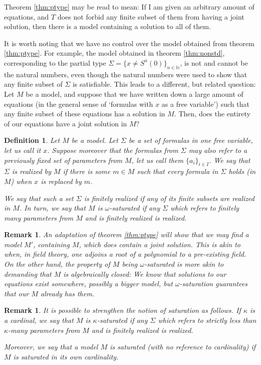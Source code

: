 \documentclass{article}
\newtheorem{remark}[theorem]{Remark}
\newtheorem{definition}[theorem]{Definition}
\theoremstyle{nonumberplain}
\newcommand{\N}{\mathbb{N}}
\begin{document}
Theorem \ref{thm:ptype} may be read to mean: If I am given an arbitrary amount of equations, and $T$ does not forbid any finite subset of them from having a joint solution, then there is a model containing a solution to all of them.

It is worth noting that we have no control over the model obtained from theorem \ref{thm:ptype}. For example, the model obtained in theorem \ref{thm:nonstd}, corresponding to the partial type $\Sigma = \{x \neq S^n(0)\}_{n \in \N}$, is not and cannot be the natural numbers, even though the natural numbers were used to show that any finite subset of $\Sigma$ is satisfiable. This leads to a different, but related question: Let $M$ be a model, and suppose that we have written down a large amount of equations (in the general sense of `formulas with $x$ as a free variable') such that any finite subset of these equations has a solution in $M$. Then, does the entirety of our equations have a joint solution in $M$?

\begin{definition}
Let $M$ be a model. Let $\Sigma$ be a set of formulas in one free variable, let us call it $x$. Suppose moreover that the formulas from $\Sigma$ may also refer to a previously fixed set of parameters from $M$, let us call them $\{a_i\}_{i \in I}$. We say that $\Sigma$ is \emph{realized by $M$} if there is some $m \in M$ such that every formula in $\Sigma$ holds (in $M$) when $x$ is replaced by $m$.

We say that such a set $\Sigma$ is \emph{finitely realized} if any of its finite subsets are realized in $M$. In turn, we say that $M$ is \emph{$\omega$-saturated} if any $\Sigma$ which refers to finitely many parameters from $M$ and is finitely realized is realized.
\end{definition}

\begin{remark}
An adaptation of theorem \ref{thm:ptype} will show that we may find a model $M'$, containing $M$, which does contain a joint solution. This is akin to when, in field theory, one adjoins a root of a polynomial to a pre-existing field. On the other hand, the property of $M$ being $\omega$-saturated is more akin to demanding that $M$ is algebraically closed: We know that solutions to our equations exist \emph{somewhere}, possibly a bigger model, but $\omega$-saturation guarantees that our $M$ already has them.
\end{remark}

\begin{remark}
It is possible to strengthen the notion of saturation as follows. If $\kappa$ is a cardinal, we say that $M$ is $\kappa$-saturated if any $\Sigma$ which refers to \emph{strictly less than} $\kappa$-many parameters from $M$ and is finitely realized is realized.

Moreover, we say that a model $M$ is saturated (with no reference to cardinality) if $M$ is saturated in its own cardinality.
\end{remark}
\end{document}
